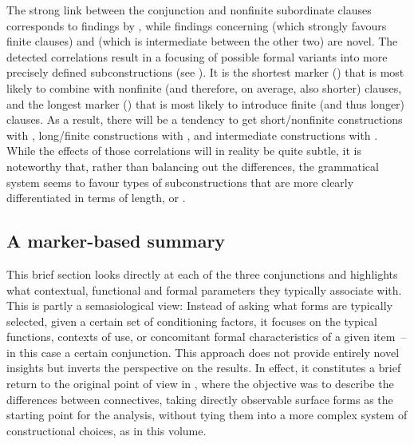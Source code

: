 The strong link between the conjunction  and nonfinite subordinate clauses corresponds to findings by \citet{Hilpert2013a}, while findings concerning  (which strongly favours finite clauses) and  (which is intermediate between the other two) are novel. The detected correlations result in a focusing of possible formal variants into more precisely defined subconstructions (see ). It is the shortest marker () that is most likely to combine with nonfinite (and therefore, on average, also shorter) clauses, and the longest marker () that is most likely to introduce finite (and thus longer) clauses. As a result, there will be a tendency to get short/nonfinite constructions with , long/finite constructions with , and intermediate constructions with . While the effects of those correlations will in reality be quite subtle, it is noteworthy that, rather than balancing out the differences, the grammatical system seems to favour types of subconstructions that are more clearly differentiated in terms of length, or .

\subsection{\label{bkm:Ref82434669}A marker-based summary}\label{sec:12.1.3}

This brief section looks directly at each of the three conjunctions and highlights what contextual, functional and formal parameters they typically associate with. This is partly a semasiological view: Instead of asking what forms are typically selected, given a certain set of conditioning factors, it focuses on the typical functions, contexts of use, or concomitant formal characteristics of a given item~– in this case a certain conjunction. This approach does not provide entirely novel insights but inverts the perspective on the results. In effect, it constitutes a brief return to the original point of view in \citet{Schützler2018c}, where the objective was to describe the differences between connectives, taking directly observable surface forms as the starting point for the analysis, without tying them into a more complex system of constructional choices, as in this volume.

